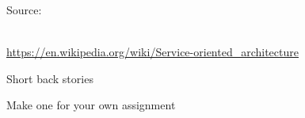 \documentclass[Screen16to9,17pt]{foils}
\begin{document}
Source:{\footnotesize\\
\url{https://en.wikipedia.org/wiki/Service-oriented_architecture}






\begin{list2}
\item
\item
\item
\item
\end{list2}





\begin{list2}
\item Short back stories
\item Make one for your own assignment
\item
\item
\end{list2}


\slide{}
\begin{list2}
\item
\item
\item
\item
\end{list2}




\begin{list2}
\item
\item
\item
\item
\end{list2}



\slide{}
\begin{list2}
\item
\item
\item
\item
\end{list2}




\begin{list2}
\item
\item
\item
\item
\end{list2}



}
\end{document}
